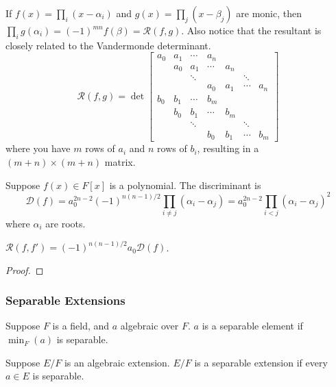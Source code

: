 \begin{remark}
    If \(f(x) = \prod_i (x-\alpha_i)\) and \(g(x) = \prod_j (x-\beta_j)\) are monic,
    then \(\prod_i g(\alpha_i) = {(-1)}^{mn} f(\beta) = \mathcal{R}(f,g)\).
    Also notice that the resultant is closely related to the Vandermonde determinant.
    \begin{equation*}
        \mathcal{R}(f,g) = \det
        \begin{bmatrix}
            a_0 & a_1 & \cdots & a_n \\
            & a_0 & a_1 & \cdots & a_n \\
            & & \ddots & & & \ddots \\
            & & & a_0 & a_1 & \cdots & a_n \\
            b_0 & b_1 & \cdots & b_m \\
            & b_0 & b_1 & \cdots & b_m \\
            & & \ddots & & & \ddots \\
            & & & b_0 & b_1 & \cdots & b_m
        \end{bmatrix}
    \end{equation*}
    where you have \(m\) rows of \(a_i\) and \(n\) rows of \(b_i\),
    resulting in a \((m+n)\times(m+n)\) matrix.
\end{remark}

\begin{definition}
    Suppose \(f(x) \in F[x]\) is a polynomial.
    The discriminant is
    \begin{equation*}
        \mathcal{D}(f) = a_0^{2n-2} {(-1)}^{n(n-1)/2}
        \prod_{i \neq j} (\alpha_i - \alpha_j)
        = a_0^{2n-2} \prod_{i<j} {(\alpha_i - \alpha_j)}^2
    \end{equation*}
    where \(\alpha_i\) are roots.
\end{definition}
\begin{proposition}
    \(\mathcal{R}(f,f') = {(-1)}^{n(n-1)/2} a_0 \mathcal{D}(f)\).
\end{proposition}
\begin{proof}
\end{proof}

\subsubsection*{Separable Extensions}

\begin{definition}
    Suppose \(F\) is a field, and \(a\) algebraic over \(F\).
    \(a\) is a separable element if \(\min_F(a)\) is separable.
\end{definition}
\begin{definition}
    Suppose \(E/F\) is an algebraic extension.
    \(E/F\) is a separable extension if every \(a \in E\) is separable.
\end{definition}

